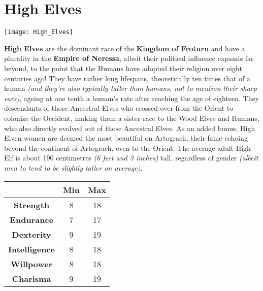 \section{High Elves}


\texttt{[image: High\_Elves]}


\textbf{High Elves} are the dominant race of the \textbf{Kingdom of Froturn} and have a plurality in the \textbf{Empire of Neressa}, albeit their political influence expands far beyond, to the point that the Humans have adopted their religion over eight centuries ago! They have rather long lifespans, theoretically ten times that of a human \textit{(and they're also typically taller than humans, not to mention their sharp ears)}, ageing at one tenth a human's rate after reaching the age of eighteen. They descendants of those Ancestral Elves who crossed over from the Orient to colonize the Occident, making them a sister-race to the Wood Elves and Humans, who also directly evolved out of those Ancestral Elves. As an added bonus, High Elven women are deemed the most beautiful on Artograch, their fame echoing beyond the continent of Artograch, even to the Orient. The average adult High Elf is about 190 centimetres \textit{(6 feet and 3 inches)} tall, regardless of gender \textit{(albeit men to tend to be slightly taller on average)}.


\begin{tabular}{|c|c|c|}
\hline
 & \textbf{Min} & \textbf{Max} \\ \hline
\textbf{Strength} & 8 & 18 \\ \hline
\textbf{Endurance} & 7 & 17 \\ \hline
\textbf{Dexterity} & 9 & 19 \\ \hline
\textbf{Intelligence} & 8 & 18 \\ \hline
\textbf{Willpower} & 8 & 18 \\ \hline
\textbf{Charisma} & 9 & 19 \\ \hline
\end{tabular}


 \newpage
